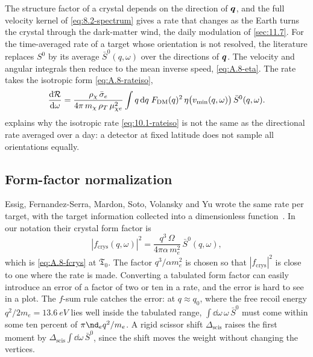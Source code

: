 The structure factor of a crystal depends on the direction of $\bm{q}$, and the full velocity kernel of \cref{eq:8.2-spectrum} gives a rate that changes as the Earth turns the crystal through the dark-matter wind, the daily modulation of \cref{sec:11.7}. For the time-averaged rate of a target whose orientation is not resolved, the literature replaces $S^0$ by its average $\bar S^0(q,\omega)$ over the directions of $\bm{q}$. The velocity and angular integrals then reduce to the mean inverse speed, \cref{eq:A.8-eta}. The rate takes the isotropic form \cref{eq:A.8-rateiso},
\begin{equation}
  \frac{\mathrm{d}\mathcal{R}}{\mathrm{d}\omega} = \frac{\rho_\chi\,\bar{\sigma}_{e}}{4\pi\,m_{\chi}\,\rho_T\,\mu_{\chi e}^2}\int q\,\mathrm{d} q\;F_{\mathrm{DM}}(q)^2\,\eta\bigl(v_{\mathrm{min}}(q,\omega)\bigr)\,\bar S^0(q,\omega) .
  \label{eq:10.1-rateiso}
\end{equation}
 explains why the isotropic rate \cref{eq:10.1-rateiso} is not the same as the directional rate averaged over a day: a detector at fixed latitude does not sample all orientations equally.

\subsection{Form-factor normalization}

Essig, Fernandez-Serra, Mardon, Soto, Volansky and Yu wrote the same rate per target, with the target information collected into a dimensionless function~\cite[Eqs.~(3.13) and (3.17)]{essig2016direct}. In our notation their crystal form factor is
\begin{equation}
  |f_{\mathrm{crys}}(q,\omega)|^2 = \frac{q^3\,\Omega}{4\pi\alpha\,m_e^2}\,\bar S^0(q,\omega) ,
  \label{eq:10.1-fcrys}
\end{equation}
which is \cref{eq:A.8-fcrys} at $\mathfrak{T}_0$. The factor $q^3/\alpha m_e^2$ is chosen so that $|f_{\mathrm{crys}}|^2$ is close to one where the rate is made. Converting a tabulated form factor can easily introduce an error of a factor of two or ten in a rate, and the error is hard to see in a plot. The $f$-sum rule catches the error: at $q \approx q_0$, where the free recoil energy $q^2/2m_e = \SI{13.6}{eV}$ lies well inside the tabulated range, $\int\dd\omega\,\omega\,\bar S^0$ must come within some ten percent of $\pi\nd_eq^2/m_e$. A rigid scissor shift $\Delta_{\mathrm{scis}}$ raises the first moment by $\Delta_{\mathrm{scis}}\int\dd\omega\,\bar S^0$, since the shift moves the weight without changing the vertices.


